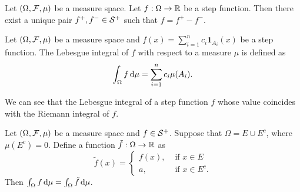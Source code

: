 \begin{corollary}
 Let $(\Omega, \F, \mu)$ be a measure space. Let $f:\Omega\to\RR$ be a step function. Then there exist a unique pair $f^+, f^-\in \S^+$ such that $f = f^+ - f^-$.
\end{corollary}

\begin{definition}
 Let $(\Omega,\F,\mu)$ be a measure space and $f(x)=\sum\limits_{i=1}^nc_i\mathbf{1}_{A_i}(x)$ be a step function. The Lebesgue integral of $f$ with respect to a measure $\mu$ is defined as
 $$\int_\Omega f \d \mu = \sum\limits_{i=1}^nc_i\mu(A_i).$$
\end{definition}

We can see that the Lebesgue integral of a step function $f$ whose value coincides with the Riemann integral of $f$.

\begin{proposition}
 \label{proposition:integral-of-almost-everywhere-equal-step-functions}
 Let $(\Omega, \F, \mu)$ be a measure space and $f\in\S^+$. Suppose that $\Omega = E\cup E^c$, where $\mu(E^c) = 0$. Define a function $\tilde{f}:\Omega\to\RR$ as
 $$\tilde{f}(x) =\begin{cases}
   f(x), & \text{ if } x\in E    \\
   a,    & \text{ if } x\in E^c.
  \end{cases}$$
 Then $\int_\Omega f \d \mu = \int_\Omega \tilde{f} \d \mu$.
\end{proposition}

